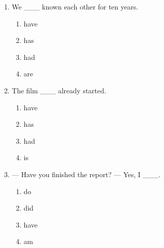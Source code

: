 \documentclass[11pt,a4paper]{ctexart}
\begin{document}
\begin{enumerate}[leftmargin=*,itemsep=4pt]
\begin{enumerate}[label=\Alph*.,leftmargin=2em,itemsep=1pt,topsep=2pt]
\end{enumerate}
\item We \_\_\_ known each other for ten years.
\begin{enumerate}[label=\Alph*.,leftmargin=2em,itemsep=1pt,topsep=2pt]
\item have
\item has
\item had
\item are
\end{enumerate}
\item The film \_\_\_ already started.
\begin{enumerate}[label=\Alph*.,leftmargin=2em,itemsep=1pt,topsep=2pt]
\item have
\item has
\item had
\item is
\end{enumerate}
\item — Have you finished the report? — Yes, I \_\_\_.
\begin{enumerate}[label=\Alph*.,leftmargin=2em,itemsep=1pt,topsep=2pt]
\item do
\item did
\item have
\item am
\end{enumerate}
\end{enumerate}
\end{document}
